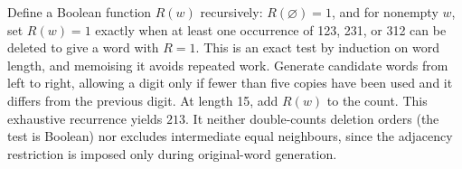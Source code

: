 Define a Boolean function $R(w)$ recursively: $R(\varnothing)=1$, and for nonempty $w$, set $R(w)=1$ exactly when at least one occurrence of 123, 231, or 312 can be deleted to give a word with $R=1$. This is an exact test by induction on word length, and memoising it avoids repeated work. Generate candidate words from left to right, allowing a digit only if fewer than five copies have been used and it differs from the previous digit. At length 15, add $R(w)$ to the count. This exhaustive recurrence yields $\boxed{213}$. It neither double-counts deletion orders (the test is Boolean) nor excludes intermediate equal neighbours, since the adjacency restriction is imposed only during original-word generation.
